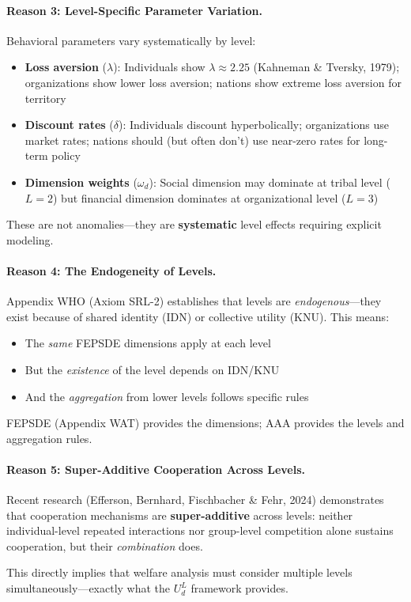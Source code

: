 \begin{tcolorbox}[colback=gray!5!white, colframe=gray!75!black, 
    title=Why AAA $\times$ C Is Theoretically Necessary]
\paragraph{Reason 3: Level-Specific Parameter Variation.}

Behavioral parameters vary systematically by level:
\begin{itemize}[nosep]
\item \textbf{Loss aversion} ($\lambda$): Individuals show $\lambda \approx 2.25$ (Kahneman \& Tversky, 1979); 
      organizations show lower loss aversion; nations show extreme loss aversion for territory
\item \textbf{Discount rates} ($\delta$): Individuals discount hyperbolically; organizations use 
      market rates; nations should (but often don't) use near-zero rates for long-term policy
\item \textbf{Dimension weights} ($\omega_d$): Social dimension may dominate at tribal level ($L=2$) 
      but financial dimension dominates at organizational level ($L=3$)
\end{itemize}

These are not anomalies---they are \textbf{systematic} level effects requiring explicit modeling.

\paragraph{Reason 4: The Endogeneity of Levels.}

Appendix WHO (Axiom SRL-2) establishes that levels are \textit{endogenous}---they exist 
because of shared identity (IDN) or collective utility (KNU). This means:
\begin{itemize}[nosep]
\item The \textit{same} FEPSDE dimensions apply at each level
\item But the \textit{existence} of the level depends on IDN/KNU
\item And the \textit{aggregation} from lower levels follows specific rules
\end{itemize}

FEPSDE (Appendix WAT) provides the dimensions; AAA provides the levels and aggregation rules.

\paragraph{Reason 5: Super-Additive Cooperation Across Levels.}

Recent research (Efferson, Bernhard, Fischbacher \& Fehr, 2024) demonstrates that 
cooperation mechanisms are \textbf{super-additive} across levels: neither individual-level 
repeated interactions nor group-level competition alone sustains cooperation, but their 
\textit{combination} does.

This directly implies that welfare analysis must consider multiple levels simultaneously---exactly 
what the $U^L_d$ framework provides.

\end{tcolorbox}

